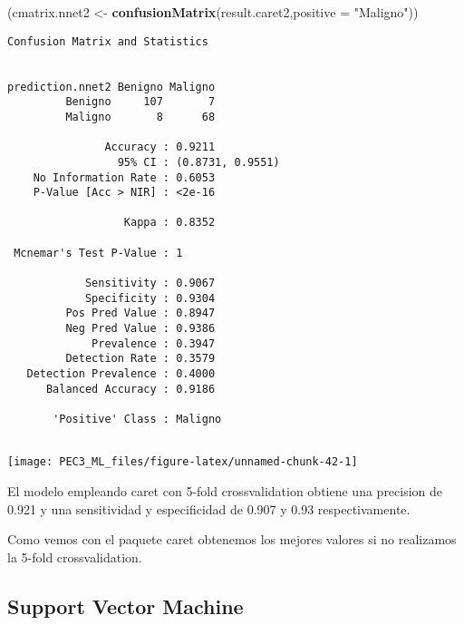 \documentclass[
]{article}
\newenvironment{Shaded}{\begin{snugshade}}{\end{snugshade}}
\newcommand{\DataTypeTok}[1]{\textcolor[rgb]{0.13,0.29,0.53}{#1}}
\newcommand{\KeywordTok}[1]{\textcolor[rgb]{0.13,0.29,0.53}{\textbf{#1}}}
\newcommand{\NormalTok}[1]{#1}
\newcommand{\StringTok}[1]{\textcolor[rgb]{0.31,0.60,0.02}{#1}}
\begin{document}
\begin{Shaded}
\begin{Highlighting}[]
\NormalTok{(cmatrix.nnet2 <-}\StringTok{ }\KeywordTok{confusionMatrix}\NormalTok{(result.caret2,}\DataTypeTok{positive =} \StringTok{"Maligno"}\NormalTok{))}
\end{Highlighting}
\end{Shaded}

\begin{verbatim}
Confusion Matrix and Statistics

                
prediction.nnet2 Benigno Maligno
         Benigno     107       7
         Maligno       8      68
                                          
               Accuracy : 0.9211          
                 95% CI : (0.8731, 0.9551)
    No Information Rate : 0.6053          
    P-Value [Acc > NIR] : <2e-16          
                                          
                  Kappa : 0.8352          
                                          
 Mcnemar's Test P-Value : 1               
                                          
            Sensitivity : 0.9067          
            Specificity : 0.9304          
         Pos Pred Value : 0.8947          
         Neg Pred Value : 0.9386          
             Prevalence : 0.3947          
         Detection Rate : 0.3579          
   Detection Prevalence : 0.4000          
      Balanced Accuracy : 0.9186          
                                          
       'Positive' Class : Maligno         
                                          
\end{verbatim}

\begin{center}\texttt{[image: PEC3\_ML\_files/figure-latex/unnamed-chunk-42-1]} \end{center}

El modelo empleando caret con 5-fold crossvalidation obtiene una
precision de 0.921 y una sensitividad y especificidad de 0.907 y 0.93
respectivamente.

Como vemos con el paquete caret obtenemos los mejores valores si no
realizamos la 5-fold crossvalidation.

\hypertarget{support-vector-machine}{%
\subsection{Support Vector Machine}\label{support-vector-machine}}
\end{document}
